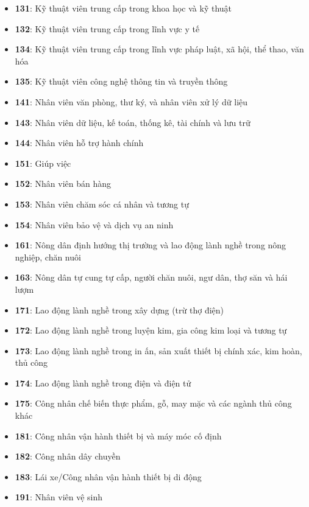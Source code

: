 \begin{itemize}
\begin{enumerate}
\begin{itemize}
              \item \textbf{131}: Kỹ thuật viên trung cấp trong khoa học và kỹ thuật
              \item \textbf{132}: Kỹ thuật viên trung cấp trong lĩnh vực y tế
              \item \textbf{134}: Kỹ thuật viên trung cấp trong lĩnh vực pháp luật, xã hội, thể thao, văn hóa
              \item \textbf{135}: Kỹ thuật viên công nghệ thông tin và truyền thông
              \item \textbf{141}: Nhân viên văn phòng, thư ký, và nhân viên xử lý dữ liệu
              \item \textbf{143}: Nhân viên dữ liệu, kế toán, thống kê, tài chính và lưu trữ
              \item \textbf{144}: Nhân viên hỗ trợ hành chính
              \item \textbf{151}: Giúp việc
              \item \textbf{152}: Nhân viên bán hàng
              \item \textbf{153}: Nhân viên chăm sóc cá nhân và tương tự
              \item \textbf{154}: Nhân viên bảo vệ và dịch vụ an ninh
              \item \textbf{161}: Nông dân định hướng thị trường và lao động lành nghề trong nông nghiệp, chăn nuôi
              \item \textbf{163}: Nông dân tự cung tự cấp, người chăn nuôi, ngư dân, thợ săn và hái lượm
              \item \textbf{171}: Lao động lành nghề trong xây dựng (trừ thợ điện)
              \item \textbf{172}: Lao động lành nghề trong luyện kim, gia công kim loại và tương tự
              \item \textbf{173}: Lao động lành nghề trong in ấn, sản xuất thiết bị chính xác, kim hoàn, thủ công
              \item \textbf{174}: Lao động lành nghề trong điện và điện tử
              \item \textbf{175}: Công nhân chế biến thực phẩm, gỗ, may mặc và các ngành thủ công khác
              \item \textbf{181}: Công nhân vận hành thiết bị và máy móc cố định
              \item \textbf{182}: Công nhân dây chuyền
              \item \textbf{183}: Lái xe/Công nhân vận hành thiết bị di động
              \item \textbf{191}: Nhân viên vệ sinh

\end{itemize}
\end{enumerate}
\end{itemize}
